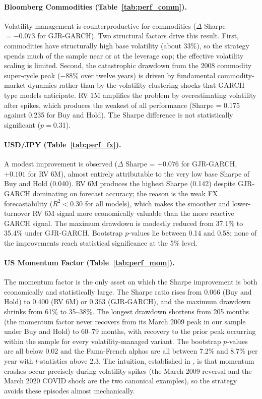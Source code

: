 \documentclass[12pt, a4paper]{article}
\begin{document}
\paragraph{Bloomberg Commodities (Table~\ref{tab:perf_comm}).}
Volatility management is counterproductive for commodities ($\Delta$ Sharpe $= -0.073$
for GJR-GARCH). Two structural factors drive this result. First, commodities have
structurally high base volatility (about 33\%), so the strategy spends much of the sample
near or at the leverage cap; the effective volatility scaling is limited. Second, the
catastrophic drawdown from the 2008 commodity super-cycle peak ($-88\%$ over twelve
years) is driven by fundamental commodity-market dynamics rather than by the
volatility-clustering shocks that GARCH-type models anticipate. RV 1M amplifies the
problem by overestimating volatility after spikes, which produces the weakest of all
performance (Sharpe = 0.175 against 0.235 for Buy and Hold). The Sharpe difference is
not statistically significant ($p = 0.31$).

\paragraph{USD/JPY (Table~\ref{tab:perf_fx}).}
A modest improvement is observed ($\Delta$ Sharpe = $+0.076$ for GJR-GARCH, $+0.101$ for
RV 6M), almost entirely attributable to the very low base Sharpe of Buy and Hold
(0.040). RV 6M produces the highest Sharpe (0.142) despite GJR-GARCH dominating on
forecast accuracy; the reason is the weak FX forecastability ($R^2 < 0.30$ for all
models), which makes the smoother and lower-turnover RV 6M signal more economically
valuable than the more reactive GARCH signal. The maximum drawdown is modestly reduced
from 37.1\% to 35.4\% under GJR-GARCH. Bootstrap $p$-values lie between 0.14 and 0.58;
none of the improvements reach statistical significance at the 5\% level.

\paragraph{US Momentum Factor (Table~\ref{tab:perf_mom}).}
The momentum factor is the only asset on which the Sharpe improvement is both
economically and statistically large. The Sharpe ratio rises from 0.066 (Buy and Hold)
to 0.400 (RV 6M) or 0.363 (GJR-GARCH), and the maximum drawdown shrinks from 61\% to
35--38\%. The longest drawdown shortens from 205 months (the momentum factor never
recovers from its March 2009 peak in our sample under Buy and Hold) to 60--79 months,
with recovery to the prior peak occurring within the sample for every volatility-managed
variant. The bootstrap $p$-values are all below 0.02 and the Fama-French alphas are all
between 7.2\% and 8.7\% per year with $t$-statistics above 2.3. The intuition,
established in \citet{Moreira2017}, is that momentum crashes occur precisely during
volatility spikes (the March 2009 reversal and the March 2020 COVID shock are the two
canonical examples), so the strategy avoids these episodes almost mechanically.
\end{document}
